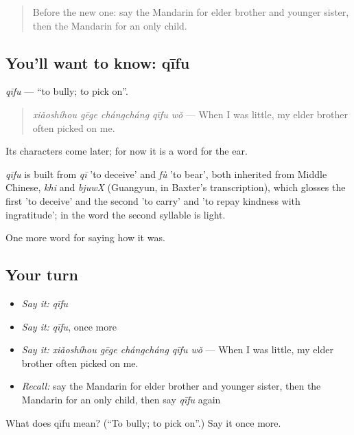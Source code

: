 \label{lesson:ZH-C508-qifu}



\begin{quote}
Before the new one: say the Mandarin for elder brother and younger sister, then the Mandarin for an only child.
\end{quote}

\subsection*{You'll want to know: qīfu}
\emph{qīfu} — \textquotedblleft{}to bully; to pick on\textquotedblright{}.

\begin{quote}
\emph{xiǎoshíhou gēge chángcháng qīfu wǒ} — When I was little, my elder brother often picked on me.
\end{quote}

Its characters come later; for now it is a word for the ear.

\begin{cousinweb}
\emph{qīfu} is built from \emph{qī} 'to deceive' and \emph{fù} 'to bear', both inherited from Middle Chinese, \emph{khi} and \emph{bjuwX} (Guangyun, in Baxter's transcription), which glosses the first 'to deceive' and the second 'to carry' and 'to repay kindness with ingratitude'; in the word the second syllable is light.
\end{cousinweb}

\begin{grammarlens}[title={What you've built}]
One more word for saying how it was.
\end{grammarlens}

\subsection*{Your turn}
\begin{itemize}
\raggedright
  \item \emph{Say it:} \emph{qīfu}
  \item \emph{Say it:} \emph{qīfu}, once more
  \item \emph{Say it:} \emph{xiǎoshíhou gēge chángcháng qīfu wǒ} — When I was little, my elder brother often picked on me.
  \item \emph{Recall:} say the Mandarin for elder brother and younger sister, then the Mandarin for an only child, then say \emph{qīfu} again
\end{itemize}

\begin{tcolorbox}[breakable,colback=teal!4,colframe=teal!35!black,title={Before you move on}]
What does qīfu mean? (\textquotedblleft{}To bully; to pick on\textquotedblright{}.) Say it once more.
\end{tcolorbox}
